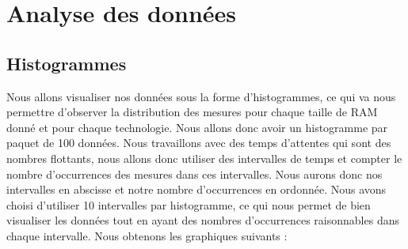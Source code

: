 \documentclass[a4paper,10pt]{article}
\begin{document}
\section{Analyse des données}

\subsection{Histogrammes}
Nous allons visualiser nos données sous la forme d'histogrammes, ce qui va nous permettre d'observer la distribution des mesures pour chaque taille de RAM donné et pour chaque
technologie. Nous allons donc avoir un histogramme par paquet de 100 données. Nous travaillons avec des temps d'attentes qui sont des nombres flottants, nous allons donc utiliser des intervalles de temps et compter le nombre d'occurrences 
des mesures dans ces intervalles. Nous aurons donc nos intervalles en abscisse et notre nombre d'occurrences en ordonnée. Nous avons choisi d'utiliser 10 intervalles
par histogramme, ce qui nous permet de bien visualiser les données tout en ayant des nombres d'occurrences raisonnables dans chaque intervalle. Nous obtenons les
graphiques suivants : \\
\\
\end{document}
